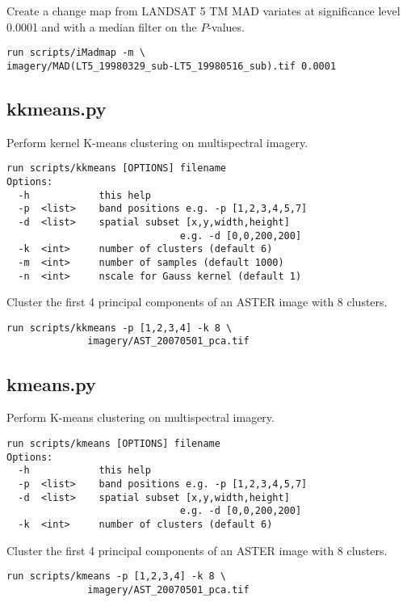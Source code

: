 \documentclass{paper}
\begin{document}
 Create a change map from LANDSAT 5 TM MAD variates at significance level 0.0001 and with a median filter on the $P$-values.
\begin{lstlisting}
run scripts/iMadmap -m \
imagery/MAD(LT5_19980329_sub-LT5_19980516_sub).tif 0.0001
\end{lstlisting}



\subsection*{kkmeans.py}
Perform kernel K-means clustering on multispectral imagery.
\begin{verbatim}
run scripts/kkmeans [OPTIONS] filename
Options:
  -h            this help
  -p  <list>    band positions e.g. -p [1,2,3,4,5,7]
  -d  <list>    spatial subset [x,y,width,height]
                              e.g. -d [0,0,200,200]
  -k  <int>     number of clusters (default 6)
  -m  <int>     number of samples (default 1000)
  -n  <int>     nscale for Gauss kernel (default 1)
\end{verbatim}
 Cluster the first 4 principal components of an ASTER image with 8 clusters.
\begin{lstlisting}
run scripts/kkmeans -p [1,2,3,4] -k 8 \
              imagery/AST_20070501_pca.tif
\end{lstlisting}





\subsection*{kmeans.py}
Perform K-means clustering on multispectral imagery.
\begin{verbatim}
run scripts/kmeans [OPTIONS] filename
Options:
  -h            this help
  -p  <list>    band positions e.g. -p [1,2,3,4,5,7]
  -d  <list>    spatial subset [x,y,width,height]
                              e.g. -d [0,0,200,200]
  -k  <int>     number of clusters (default 6)
\end{verbatim}
 Cluster the first 4 principal components of an ASTER image with 8 clusters.
\begin{lstlisting}
run scripts/kmeans -p [1,2,3,4] -k 8 \
              imagery/AST_20070501_pca.tif
\end{lstlisting}
\end{document}
